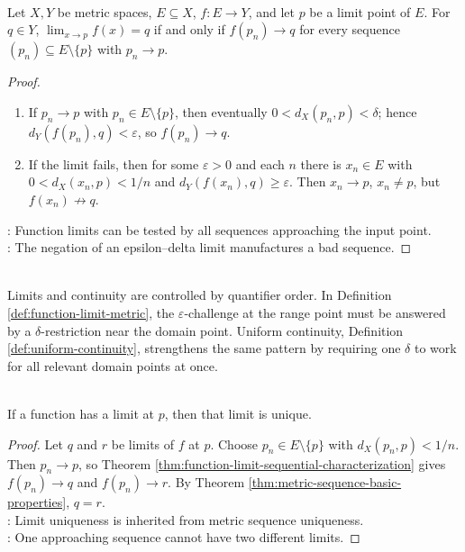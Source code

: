 \begin{theorem} \label{thm:function-limit-sequential-characterization} \\
Let $X,Y$ be metric spaces, $E\subseteq X$, $f:E\to Y$, and let $p$ be a limit point of $E$. For $q\in Y$, $\lim_{x\to p}f(x)=q$ if and only if $f(p_n)\to q$ for every sequence $(p_n)\subseteq E\setminus\{p\}$ with $p_n\to p$.
\begin{proof}
\begin{enumerate}[label=\roman*.]
\setlength{\itemsep}{0pt}
\item[$(\Rightarrow)$] If $p_n\to p$ with $p_n\in E\setminus\{p\}$, then eventually $0<d_X(p_n,p)<\delta$; hence $d_Y(f(p_n),q)<\varepsilon$, so $f(p_n)\to q$.
\item[$(\Leftarrow)$] If the limit fails, then for some $\varepsilon>0$ and each $n$ there is $x_n\in E$ with $0<d_X(x_n,p)<1/n$ and $d_Y(f(x_n),q)\geq\varepsilon$. Then $x_n\to p$, $x_n\neq p$, but $f(x_n)\not\to q$.
\end{enumerate}
: Function limits can be tested by all sequences approaching the input point.\\
: The negation of an epsilon--delta limit manufactures a bad sequence.
\end{proof}
\end{theorem}

\begin{principle} \label{pri:continuity-challenge-response} \\
Limits and continuity are controlled by quantifier order. In Definition \ref{def:function-limit-metric}, the $\varepsilon$-challenge at the range point must be answered by a $\delta$-restriction near the domain point. Uniform continuity, Definition \ref{def:uniform-continuity}, strengthens the same pattern by requiring one $\delta$ to work for all relevant domain points at once.
\end{principle}

\begin{corollary} \label{cor:function-limits-are-unique} \\
If a function has a limit at $p$, then that limit is unique.
\begin{proof}
Let $q$ and $r$ be limits of $f$ at $p$. Choose $p_n\in E\setminus\{p\}$ with $d_X(p_n,p)<1/n$. Then $p_n\to p$, so Theorem \ref{thm:function-limit-sequential-characterization} gives $f(p_n)\to q$ and $f(p_n)\to r$. By Theorem \ref{thm:metric-sequence-basic-properties}, $q=r$.\\
: Limit uniqueness is inherited from metric sequence uniqueness.\\
: One approaching sequence cannot have two different limits.
\end{proof}
\end{corollary}

